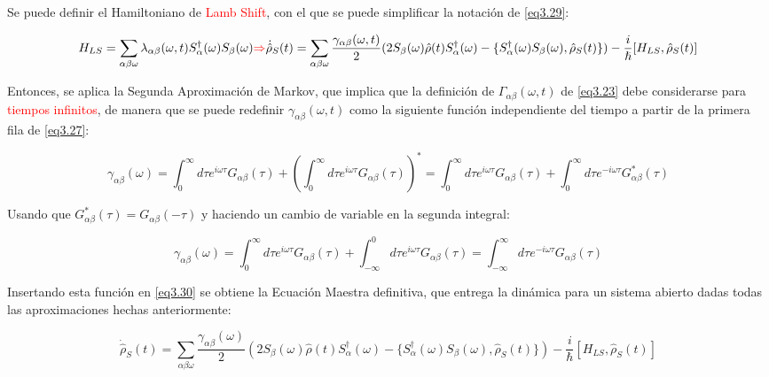 \documentclass{book}
\begin{document}
Se puede definir el Hamiltoniano de \textcolor{red}{Lamb Shift}, con el que se puede simplificar la notación de \ref{eq3.29}:

\begin{equation}\label{eq3.30}H_{LS}=\sum_{\alpha\beta\omega}\lambda_{\alpha\beta}(\omega,t)S_\alpha^\dag(\omega)S_\beta(\omega)\textcolor{red}{\Rightarrow}\dot{\hat{\rho}}_S(t)=\sum_{\alpha\beta\omega} \frac{\gamma_{\alpha\beta}(\omega, t)}{2}(2S_\beta(\omega)\hat{\rho}(t)S_\alpha^\dag (\omega)-\{S_\alpha^\dag(\omega)S_\beta(\omega),\hat{\rho}_S(t)\})-\frac{i}{\hslash}[H_{LS},\hat{\rho}_S(t)]\end{equation}

Entonces, se aplica la Segunda Aproximación de Markov, que implica que la definición de $\Gamma_{\alpha\beta}(\omega,t)$ de \ref{eq3.23} debe considerarse para \textcolor{red}{tiempos infinitos}, de manera que se puede redefinir $\gamma_{\alpha\beta}(\omega,t)$ como la siguiente función independiente del tiempo a partir de la primera fila de \ref{eq3.27}:

\begin{equation}\label{eq3.31}\gamma_{\alpha\beta}(\omega)=\int_0^\infty d\tau e^{i\omega\tau}G_{\alpha\beta}(\tau)+(\int_0^\infty d\tau e^{i\omega\tau}G_{\alpha\beta}(\tau))^*=\int_0^\infty d\tau e^{i\omega\tau}G_{\alpha\beta}(\tau)+\int_0^\infty d\tau e^{-i\omega\tau}G^*_{\alpha\beta}(\tau)\end{equation}

Usando que $G_{\alpha\beta}^*(\tau)=G_{\alpha\beta}(-\tau)$ y haciendo un cambio de variable en la segunda integral:

\begin{equation}\label{eq3.32}\gamma_{\alpha\beta}(\omega)=\int_0^\infty d\tau e^{i\omega\tau}G_{\alpha\beta}(\tau)+\int_{-\infty}^0 d\tau e^{i\omega\tau}G_{\alpha\beta}(\tau)=\int_{-\infty}^\infty d\tau e^{-i\omega\tau}G_{\alpha\beta}(\tau)\end{equation}

Insertando esta función en \ref{eq3.30} se obtiene la Ecuación Maestra definitiva, que entrega la dinámica para un sistema abierto dadas todas las aproximaciones hechas anteriormente:

\begin{equation}\label{eq3.33}\dot{\hat{\rho}}_S(t)=\sum_{\alpha\beta\omega} \frac{\gamma_{\alpha\beta}(\omega)}{2}(2S_\beta(\omega)\hat{\rho}(t)S_\alpha^\dag (\omega)-\{S_\alpha^\dag(\omega)S_\beta(\omega),\hat{\rho}_S(t)\})-\frac{i}{\hslash}[H_{LS},\hat{\rho}_S(t)]\end{equation}
\end{document}

